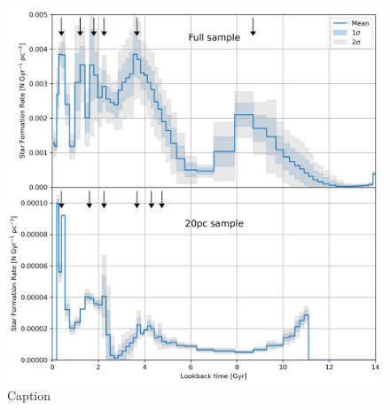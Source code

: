 \documentclass[fleqn,usenatbib]{mnras}
\begin{document}
\begin{figure}
    \centering
    \includegraphics[width=\columnwidth]{figures/fig_06_sfh_bootstrap_comparison.png}
    \caption{Caption}
    \label{fig:bootstrap_mean}
\end{figure}

\end{document}
